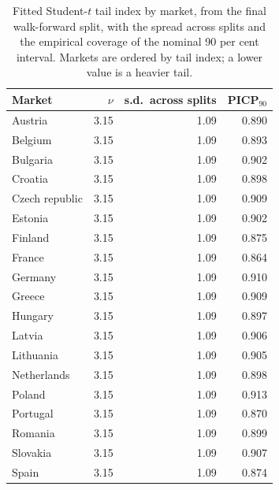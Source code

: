 \begin{table}[htbp]
\centering
\small
\caption{Fitted Student-$t$ tail index by market, from the final walk-forward split, with the spread across splits and the empirical coverage of the nominal 90 per cent interval. Markets are ordered by tail index; a lower value is a heavier tail.}
\label{tab:nu-by-channel}
\begin{tabular}{@{}lrrr@{}}
\toprule
Market & $\nu$ & s.d.\ across splits & PICP$_{90}$ \\
\midrule
Austria & 3.15 & 1.09 & 0.890 \\
Belgium & 3.15 & 1.09 & 0.893 \\
Bulgaria & 3.15 & 1.09 & 0.902 \\
Croatia & 3.15 & 1.09 & 0.898 \\
Czech republic & 3.15 & 1.09 & 0.909 \\
Estonia & 3.15 & 1.09 & 0.902 \\
Finland & 3.15 & 1.09 & 0.875 \\
France & 3.15 & 1.09 & 0.864 \\
Germany & 3.15 & 1.09 & 0.910 \\
Greece & 3.15 & 1.09 & 0.909 \\
Hungary & 3.15 & 1.09 & 0.897 \\
Latvia & 3.15 & 1.09 & 0.906 \\
Lithuania & 3.15 & 1.09 & 0.905 \\
Netherlands & 3.15 & 1.09 & 0.898 \\
Poland & 3.15 & 1.09 & 0.913 \\
Portugal & 3.15 & 1.09 & 0.870 \\
Romania & 3.15 & 1.09 & 0.899 \\
Slovakia & 3.15 & 1.09 & 0.907 \\
Spain & 3.15 & 1.09 & 0.874 \\
\bottomrule
\end{tabular}
\end{table}
